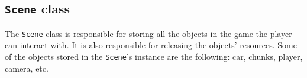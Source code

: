 \subsection{\texttt{Scene} class} \label{subsec:scene-class}
The \texttt{Scene} class is responsible for storing all the objects in the game the player can interact with.
It is also responsible for releasing the objects' resources.
Some of the objects stored in the \texttt{Scene}'s instance are the following: car, chunks, player, camera, etc.